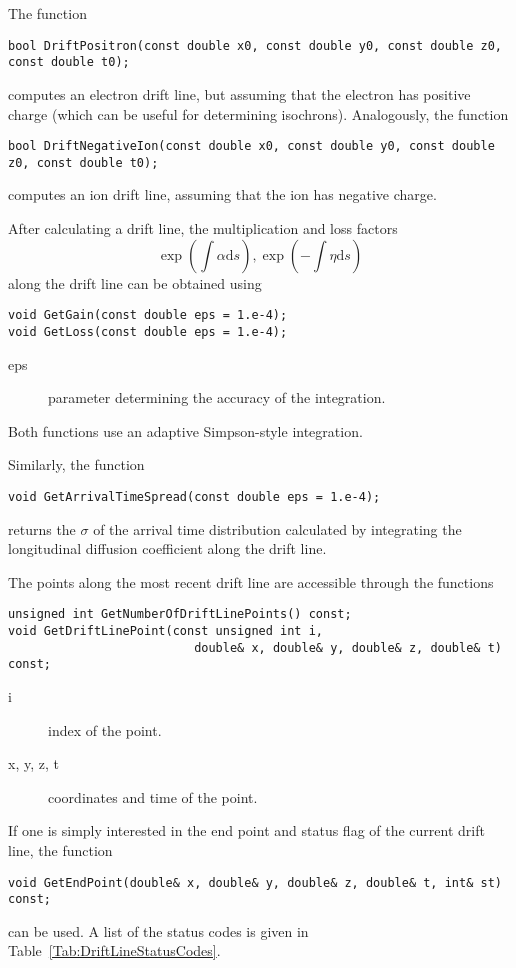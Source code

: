 The function 
\begin{lstlisting}
bool DriftPositron(const double x0, const double y0, const double z0, const double t0);
\end{lstlisting}
computes an electron drift line, but assuming that the electron has positive charge 
(which can be useful for determining isochrons). Analogously, the function
\begin{lstlisting}
bool DriftNegativeIon(const double x0, const double y0, const double z0, const double t0);
\end{lstlisting}
computes an ion drift line, assuming that the ion has negative charge.

After calculating a drift line, the multiplication and loss factors 
\begin{equation*}
  \exp\left(\int\alpha\text{d}s\right), \exp\left(-\int\eta\text{d}s\right)
\end{equation*}
along the drift line can be obtained using 
\begin{lstlisting}
void GetGain(const double eps = 1.e-4);
void GetLoss(const double eps = 1.e-4);
\end{lstlisting}
\begin{description}
  \item[eps] parameter determining the accuracy of the integration.
\end{description}
Both functions use an adaptive Simpson-style integration.

Similarly, the function
\begin{lstlisting}
void GetArrivalTimeSpread(const double eps = 1.e-4);
\end{lstlisting}
returns the $\sigma$ of the arrival time distribution calculated by 
integrating the longitudinal diffusion coefficient along the drift line. 

The points along the most recent drift line are accessible through the functions
\begin{lstlisting}
unsigned int GetNumberOfDriftLinePoints() const;
void GetDriftLinePoint(const unsigned int i, 
                          double& x, double& y, double& z, double& t) const;
\end{lstlisting}
\begin{description}
  \item[i] index of the point.
  \item[x, y, z, t] coordinates and time of the point. 
\end{description}
If one is simply interested in the end point and status flag of the 
current drift line, the function
\begin{lstlisting}
void GetEndPoint(double& x, double& y, double& z, double& t, int& st) const;
\end{lstlisting}
can be used. A list of the status codes 
is given in Table~\ref{Tab:DriftLineStatusCodes}.

